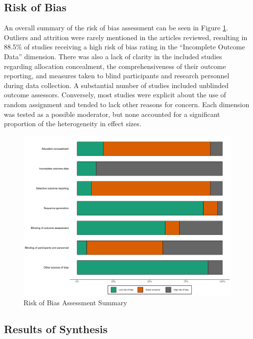 \documentclass[
  english,
  man, donotrepeattitle,floatsintext]{apa7}
\begin{document}
\hypertarget{risk-of-bias}{%
\subsection{Risk of Bias}\label{risk-of-bias}}

An overall summary of the risk of bias assessment can be seen in Figure \ref{fig:fig2}. Outliers and attrition were rarely mentioned in the articles reviewed, resulting in 88.5\% of studies receiving a high risk of bias rating in the ``Incomplete Outcome Data'' dimension. There was also a lack of clarity in the included studies regarding allocation concealment, the comprehensiveness of their outcome reporting, and measures taken to blind participants and research personnel during data collection. A substantial number of studies included unblinded outcome assessors. Conversely, most studies were explicit about the use of random assignment and tended to lack other reasons for concern. Each dimension was tested as a possible moderator, but none accounted for a significant proportion of the heterogeneity in effect sizes.



\begin{figure}

{\centering \includegraphics[height=0.6\textheight]{../../figures/fig2} 

}

\caption{Risk of Bias Assessment Summary}\label{fig:fig2}
\end{figure}

\hypertarget{results-of-synthesis}{%
\subsection{Results of Synthesis}\label{results-of-synthesis}}
\end{document}
